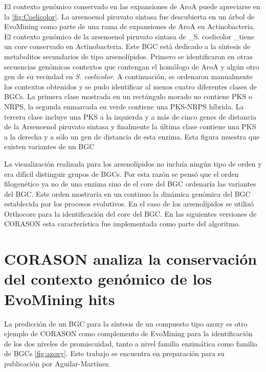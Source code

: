 \documentclass[12pt,twoside]{reedthesis}
\begin{document}
  El contexto genómico conservado en las expansiones de AroA puede
  apreciarse en la \autoref{fig:Coelicolor}. La arsenoenol piruvato
  sintasa fue descubierta en un árbol de EvoMining como parte de una rama
  de expansiones de AroA en Actinobacteria. El contexto genómico de la
  arsenoenol piruvato sintasa de \_S. coelicolor \_tiene un core
  conservado en Actinobacteria. Este BGC está dedicado a la síntesis de
  metabolitos secundarios de tipo arsenolípidos. Primero se identificaron
  en otras secuencias genómicas contextos que contengan el homólogo de
  AroA y algún otro gen de su vecindad en \emph{S. coelicolor}. A
  continuación, se ordenaron manualmente los contextos obtenidos y se pudo
  identificar al menos cuatro diferentes clases de BGCs. La primera clase
  mostrada en un rectángulo morado no contiene PKS o NRPS, la segunda
  enmarcada en verde contiene una PKS-NRPS híbrida. La tercera clase
  incluye una PKS a la izquierda y a más de cinco genes de distancia de la
  Arsenoenol piruvato sintasa y finalmente la última clase contiene una
  PKS a la derecha y a sólo un gen de distancia de esta enzima. Esta
  figura muestra que existen variantes de un BGC
  
  La visualización realizada para los arsenolípidos no incluía ningún tipo
  de orden y era difícil distinguir grupos de BGCs. Por esta razón se
  pensó que el orden filogenético ya no de una enzima sino de el core del
  BGC ordenaría las variantes del BGC. Este orden mostraría en un continuo
  la dinámica genómica del BGC establecida por los procesos evolutivos. En
  el caso de los arsenolípidos se utilizó Orthocore para la identificación
  del core del BGC. En las siguientes versiones de CORASON esta
  característica fue implementada como parte del algoritmo.
  
  \section{CORASON analiza la conservación del contexto genómico de los
  EvoMining
  hits}\label{corason-analiza-la-conservacion-del-contexto-genomico-de-los-evomining-hits}
  
  La predicción de un BGC para la síntesis de un compuesto tipo azoxy es
  otro ejemplo de CORASON como complemento de EvoMining para la
  identificación de los dos niveles de promiscuidad, tanto a nivel familia
  enzimática como familia de BGCs \autoref{fig:azoxy}. Este trabajo se
  encuentra en preparación para su publicación por Aguilar-Martínez.
  
\end{document}
